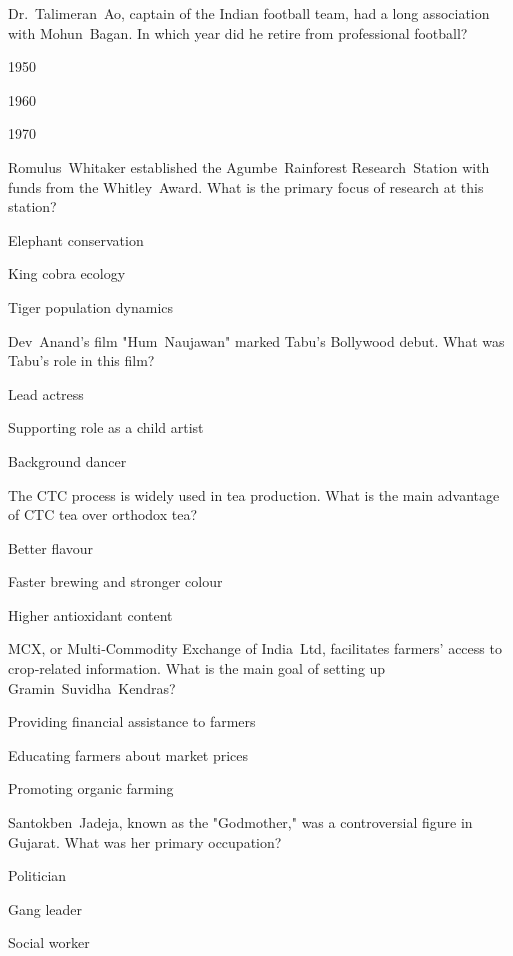 \begin{enhancedmcq}{Dr. Talimeran Ao, captain of the Indian football team, had a long association with Mohun Bagan. In which year did he retire from professional football?}
\item 1950
\item 1960
\item 1970

\end{enhancedmcq}
\begin{enhancedmcq}{Romulus Whitaker established the Agumbe Rainforest Research Station with funds from the Whitley Award. What is the primary focus of research at this station?}
\item Elephant conservation
\item King cobra ecology
\item Tiger population dynamics

\end{enhancedmcq}
\begin{enhancedmcq}{Dev Anand's film "Hum Naujawan" marked Tabu's Bollywood debut. What was Tabu's role in this film?}
\item Lead actress
\item Supporting role as a child artist
\item Background dancer

\end{enhancedmcq}
\begin{enhancedmcq}{The CTC process is widely used in tea production. What is the main advantage of CTC tea over orthodox tea?}
\item Better flavour
\item Faster brewing and stronger colour
\item Higher antioxidant content

\end{enhancedmcq}
\begin{enhancedmcq}{MCX, or Multi‑Commodity Exchange of India Ltd, facilitates farmers' access to crop‑related information. What is the main goal of setting up Gramin Suvidha Kendras?}
\item Providing financial assistance to farmers
\item Educating farmers about market prices
\item Promoting organic farming

\end{enhancedmcq}
\begin{enhancedmcq}{Santokben Jadeja, known as the "Godmother," was a controversial figure in Gujarat. What was her primary occupation?}
\item Politician
\item Gang leader
\item Social worker

\end{enhancedmcq}
